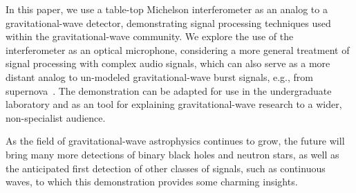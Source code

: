 \documentclass[paper-main.tex]{subfiles}
\begin{document}


In this paper, we use a table-top Michelson interferometer as an analog to a gravitational-wave detector, demonstrating signal processing techniques used within the gravitational-wave community.
We explore the use of the interferometer as an optical microphone, considering a more general treatment of signal processing with complex audio signals, which can also serve as a more distant analog to un-modeled gravitational-wave burst signals, e.g., from supernova~\cite{MillhouseEtAl:2018,SuvorovaPowellMelatos:2019}.
The demonstration can be adapted for use in the undergraduate laboratory and as an tool for explaining gravitational-wave research to a wider, non-specialist audience. 


\begin{comment}

The demonstration presented has the potential to be adapted for use in the undergraduate laboratory.
It can be used to teach topics of interest to physics and electrical engineering students including interferometer physics; gravitational-wave detection, searches, and analysis; and signal processing with filters and speech enhancement techniques. 
The increased excitement and public interest in the field of gravitational-wave research in recent years mean that this demonstration may also be adapted as a tool for explaining gravitational-wave research to a wider, non-specialist audience. 

\end{comment}

As the field of gravitational-wave astrophysics continues to grow, the future will bring many more detections of binary black holes and neutron stars, as well as the anticipated first detection of other classes of signals, such as continuous waves, to which this demonstration provides some charming insights. 
\end{document}
